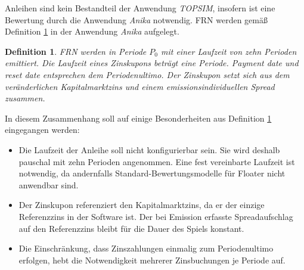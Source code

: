\documentclass[12pt, a4paper]{article}
\theoremstyle{plain}
\newtheorem{definition}{Definition}
\begin{document}
Anleihen sind kein Bestandteil der Anwendung \textit{TOPSIM}, insofern ist eine Bewertung durch die Anwendung \textit{Anika} notwendig. \gls{FRN} werden gemäß Definition \ref{def:floater} in der Anwendung \textit{Anika} aufgelegt.

\begin{definition}
	\label{def:floater}
	\gls{FRN} werden in Periode $P_0$ mit einer Laufzeit von zehn Perioden emittiert. Die Laufzeit eines Zinskupons beträgt eine Periode. \textit{Payment date} und \textit{reset date} entsprechen dem Periodenultimo. Der Zinskupon setzt sich aus dem veränderlichen Kapitalmarktzins und einem emissionsindividuellen Spread zusammen.
\end{definition}

In diesem Zusammenhang soll auf einige Besonderheiten aus Definition \ref{def:floater} eingegangen werden:
\begin{itemize}
	\item Die Laufzeit der Anleihe soll nicht konfigurierbar sein. Sie wird deshalb pauschal mit zehn Perioden angenommen. Eine fest vereinbarte Laufzeit ist notwendig, da andernfalls Standard-Bewertungsmodelle für Floater nicht anwendbar sind. 
	\item Der Zinskupon referenziert den Kapitalmarktzins, da er der einzige Referenzzins in der Software ist. Der bei Emission erfasste Spreadaufschlag auf den Referenzzins bleibt für die Dauer des Spiels konstant.
	\item Die Einschränkung, dass Zinszahlungen einmalig zum Periodenultimo erfolgen, hebt die Notwendigkeit mehrerer Zinsbuchungen je Periode auf.
\end{itemize}



\end{document}
